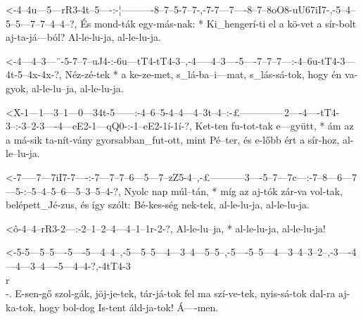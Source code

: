 

  {<-4--4u---5---rR3-4t--5----:-¦----------8--7--5-7--7-,-7-7---7----8--7--8oO8-uU67iI7-,-5--4--5--5---7--7--4--4--?,}
  {  És mond-ták egy-más-nak: * Ki_hengerí-ti el a kö-vet a sír-bolt aj-ta-já---ból?      Al-le-lu-ja, al-le-lu-ja.}


  {<-4---4--3---¨-5-7--7--uJ4-:-6u---tT4-tT4-3--,-4-----4--3----5----7--7--7---:-4--6u-tT4-3---4t-5--4x-4x-?,}
  {  Néz-zé-tek * a ke-ze-met,  s_lá-ba--i---mat, s_lás-sá-tok, hogy én va-gyok, al-le-lu--ja, al-le-lu-ja.}



  {<X-1---1---3--1---0---34t-5------:-4--6--5-4--4---4--3t--4--:-£--------------2----4----tT4-3--:-3--2-3----4---eE2-1---qQ0-:-1--eE2-1í-1í-?,}
  {   Ket-ten fu-tot-tak e---gyütt, * ám az a má-sik ta-nít-vány gyorsabban_fut-ott, mint Pé--ter, és e-lőbb ért a   sír-hoz,  al-le--lu-ja.}



  {<-7-----7---7iI7-7----:-7---7--7--6---5---7--zZ5-4--,-£-----------3----5--7---7c---:-7--8---6---7---5-:--5--4--5--6---5--3--5--4-?,}
  {  Nyolc nap múl--tán, * míg az aj-tók zár-va vol-tak, belépett_Jé-zus, és így szólt: Bé-kes-ség nek-tek, al-le-lu-ja, al-le-lu-ja.}




  {<ô-4--4--rR3-2---:-2--1--2--4---4--1--1r-2-?,}
  {   Al-le-lu--ja, * al-le-lu-ja, al-le-lu-ja!}

  {<-5-5---5--5----5----5---4--4--,-5---5--5---4---3--4---5--5--,-5----5--5---4---3--4--3--2--,-3----4---4---3--4----5---4--4-?,-4tT4-3\\r\\-.}
  {  E-sen-gő szol-gák, jöj-je-tek, tár-já-tok fel ma szí-ve-tek, nyis-sá-tok dal-ra aj-ka-tok, hogy bol-dog Is-tent áld-ja-tok! Á----men.}

